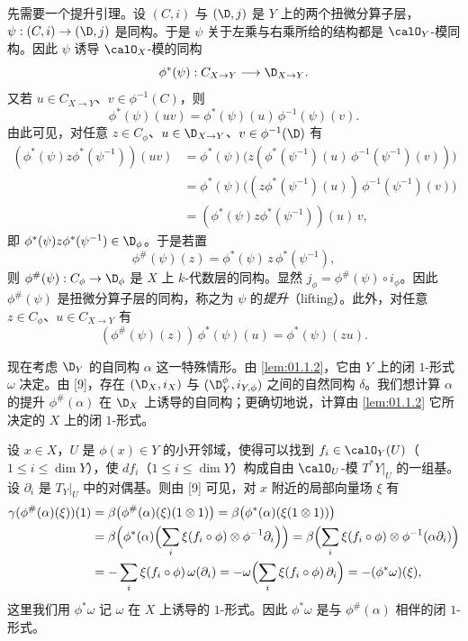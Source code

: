 先需要一个提升引理。设 $(C,i)$ 与 $(\D,j)$ 是 $Y$ 上的两个扭微分算子层，$\psi:(C,i)\to(\D,j)$ 是同构。于是 $\psi$ 关于左乘与右乘所给的结构都是 $\calO_Y$-模同构。因此 $\psi$ 诱导 $\calO_X$-模的同构
$$\phi^*(\psi):C_{X\to Y}\longrightarrow\D_{X\to Y}.$$
又若 $u\in C_{X\to Y}$、$v\in\phi^{-1}(C)$，则
$$\phi^*(\psi)(uv)=\phi^*(\psi)(u)\,\phi^{-1}(\psi)(v).$$
由此可见，对任意 $z\in C_\phi$、$u\in\D_{X\to Y}$、$v\in\phi^{-1}(\D)$ 有
\begin{align*}
(\phi^*(\psi)z\phi^*(\psi^{-1}))(uv)&=\phi^*(\psi)\bigl(z(\phi^*(\psi^{-1})(u)\,\phi^{-1}(\psi^{-1})(v))\bigr)\\
&=\phi^*(\psi)\bigl((z\phi^*(\psi^{-1})(u))\,\phi^{-1}(\psi^{-1})(v)\bigr)\\
&=(\phi^*(\psi)z\phi^*(\psi^{-1}))(u)\,v,
\end{align*}
即 $\phi^*(\psi)z\phi^*(\psi^{-1})\in\D_\phi$。于是若置
$$\phi^\#(\psi)(z)=\phi^*(\psi)\,z\,\phi^*(\psi^{-1}),$$
则 $\phi^\#(\psi):C_\phi\to\D_\phi$ 是 $X$ 上 $k$-代数层的同构。显然 $j_\phi=\phi^\#(\psi)\circ i_\phi$。因此 $\phi^\#(\psi)$ 是扭微分算子层的同构，称之为 $\psi$ 的\emph{提升}（lifting）。此外，对任意 $z\in C_\phi$、$u\in C_{X\to Y}$ 有
$$(\phi^\#(\psi)(z))\,\phi^*(\psi)(u)=\phi^*(\psi)(zu).$$

现在考虑 $\D_Y$ 的自同构 $\alpha$ 这一特殊情形。由 \ref{lem:01.1.2}，它由 $Y$ 上的闭 $1$-形式 $\omega$ 决定。由 [9]，存在 $(\D_X,i_X)$ 与 $(\D_Y^\phi,i_{Y,\phi})$ 之间的自然同构 $\delta$。我们想计算 $\alpha$ 的提升 $\phi^\#(\alpha)$ 在 $\D_X$ 上诱导的自同构；更确切地说，计算由 \ref{lem:01.1.2} 它所决定的 $X$ 上的闭 $1$-形式。

设 $x\in X$，$U$ 是 $\phi(x)\in Y$ 的小开邻域，使得可以找到 $f_i\in\calO_Y(U)$（$1\le i\le\dim Y$），使 $df_i$（$1\le i\le\dim Y$）构成自由 $\calO_U$-模 $T^*Y|_U$ 的一组基。设 $\partial_i$ 是 $T_Y|_U$ 中的对偶基。则由 [9] 可见，对 $x$ 附近的局部向量场 $\xi$ 有
\begin{align*}
\gamma(\phi^\#(\alpha)(\xi))(1)&=\beta\bigl(\phi^\#(\alpha)(\xi)(1\otimes 1)\bigr)=\beta\bigl(\phi^*(\alpha)(\xi(1\otimes 1))\bigr)\\
&=\beta\Bigl(\phi^*(\alpha)\Bigl(\sum_i \xi(f_i\circ\phi)\otimes\phi^{-1}\partial_i\Bigr)\Bigr)=\beta\Bigl(\sum_i \xi(f_i\circ\phi)\otimes\phi^{-1}(\alpha\partial_i)\Bigr)\\
&=-\sum_i \xi(f_i\circ\phi)\,\omega(\partial_i)=-\omega\Bigl(\sum_i \xi(f_i\circ\phi)\,\partial_i\Bigr)=-(\phi^*\omega)(\xi),
\end{align*}
这里我们用 $\phi^*\omega$ 记 $\omega$ 在 $X$ 上诱导的 $1$-形式。因此 $\phi^*\omega$ 是与 $\phi^\#(\alpha)$ 相伴的闭 $1$-形式。

